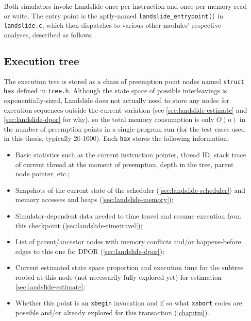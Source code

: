 Both simulators invoke Landslide once per instruction and once per memory read or write.
The entry point is the aptly-named {\tt landslide\_entrypoint()} in {\tt landslide.c},
which then dispatches to various other modules' respective analyses, described as follows.


\subsection{Execution tree}
\label{sec:landslide-save}

The execution tree
is stored as a chain of preemption point nodes named {\tt struct hax} defined in {\tt tree.h}.
Although the state space of possible interleavings is exponentially-sized,
Landslide does not actually need to store any nodes for execution sequences outside the current variation
(see \cref{sec:landslide-estimate} and \cref{sec:landslide-dpor} for why),
so the total memory consumption is only $O(n)$ in the number of preemption points in a single program run
(for the test cases used in this thesis, typically 20-1000).
Each {\tt hax} stores the following information:

\begin{itemize}
	\item Basic statistics such as the current instruction pointer, thread ID,
		stack trace of current thread at the moment of preemption,
		depth in the tree, parent node pointer, etc.;
	\item Snapshots of the current state of the scheduler (\cref{sec:landslide-scheduler})
		and memory accesses and heaps (\cref{sec:landslide-memory});
	\item Simulator-dependent data needed to time travel and resume execution
		from this checkpoint (\cref{sec:landslide-timetravel});
	\item List of parent/ancestor nodes with memory conflicts and/or happens-before edges to this one
		for DPOR (\cref{sec:landslide-dpor});
	\item Current estimated state space proportion and execution time for the subtree rooted at this node
		(not necessarily fully explored yet) for estimation \cref{sec:landslide-estimate};
	\item Whether this point is an {\tt xbegin} invocation
		and if so what {\tt xabort} codes are possible and/or already explored for this transaction
		(\cref{chap:tm}).
\end{itemize}

